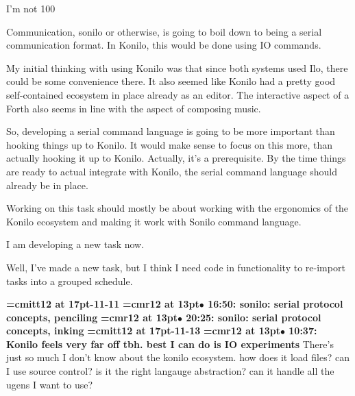 I'm not 100%
\par

Communication, sonilo or otherwise, is going to boil down to being a serial communication format. In Konilo, this would be done using IO commands.
\par

My initial thinking with using Konilo was that since both systems used Ilo, there could be some convenience there. It also seemed like Konilo had a pretty good self-contained ecosystem in place already as an editor. The interactive aspect of a Forth also seems in line with the aspect of composing music.
\par

So, developing a serial command language is going to be more important than hooking things up to Konilo. It would make sense to focus on this more, than actually hooking it up to Konilo. Actually, it's a prerequisite. By the time things are ready to actual integrate with Konilo, the serial command language should already be in place.
\par

Working on this task should mostly be about working with the ergonomics of the Konilo ecosystem and making it work with Sonilo command language.
\par

I am developing a new task now.
\par

Well, I've made a new task, but I think I need code in functionality to re-import tasks into a grouped schedule.
\par

{\medskip\noindent\bf\font\titlefont=cmitt12 at 17pt-11-11}\medskip
{\smallskip\noindent\bf\font\titlefont=cmr12 at 13pt\titlefont $\bullet$ 16:50: sonilo: serial protocol concepts, penciling}\smallskip
{\smallskip\noindent\bf\font\titlefont=cmr12 at 13pt\titlefont $\bullet$ 20:25: sonilo: serial protocol concepts, inking}\smallskip
{\medskip\noindent\bf\font\titlefont=cmitt12 at 17pt-11-13}\medskip
{\smallskip\noindent\bf\font\titlefont=cmr12 at 13pt\titlefont $\bullet$ 10:37: Konilo feels very far off tbh. best I can do is IO experiments}\smallskip
There's just so much I don't know about the konilo ecosystem. how does it load files? can I use source control? is it the right langauge abstraction? can it handle all the ugens I want to use?
\par

